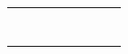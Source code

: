 \begin{table}[]
\begin{tabular}{|l|l|l|l|l|l|l|l|l|}
		&                              &                                                    &         &                                                    &         &                                                    &         &                                                 \\ \hline
		&                              &                                                    &         &                                                    &         &                                                    &         &                                                 \\ \hline
		&                              &                                                    &         &                                                    &         &                                                    &         &                                                 \\ \hline
		&                              &                                                    &         &                                                    &         &                                                    &         &                                                 \\ \hline
		&                              &                                                    &         &                                                    &         &                                                    &         &                                                 \\ \hline
		&                              &                                                    &         &                                                    &         &                                                    &         &                                                 \\ \hline
		&                              &                                                    &         &                                                    &         &                                                    &         &                                                 \\ \hline
		&                              &                                                    &         &                                                    &         &                                                    &         &                                                 \\ \hline
		&                              &                                                    &         &                                                    &         &                                                    &         &                                                 \\ \hline

\end{tabular}
\end{table}
